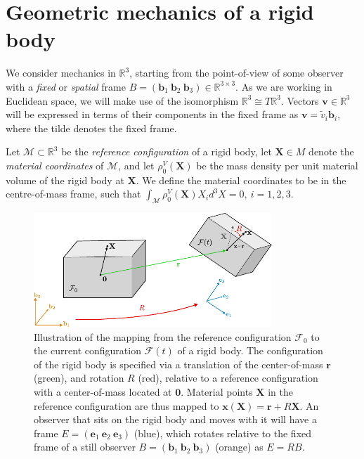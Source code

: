 \section{Geometric mechanics of a rigid body} \label{sec:Introduction - rigid body}

We consider mechanics in $\mathbb{R}^3$, starting from the point-of-view of some observer with a \textit{fixed} or \textit{spatial} frame $B = (\mathbf{b}_1\ \mathbf{b}_2\ \mathbf{b}_3) \in \mathbb{R}^{3 \times 3}$. As we are working in Euclidean space, we will make use of the isomorphism $\mathbb{R}^3 \cong T\mathbb{R}^3$. Vectors $\mathbf{v} \in \mathbb{R}^3$ will be expressed in terms of their components in the fixed frame as $\mathbf{v} = \tilde{v}_i \mathbf{b}_i$, where the tilde denotes the fixed frame.

Let $\mathcal{M} \subset \mathbb{R}^3$ be the \textit{reference configuration} of a rigid body, let $\mathbf{X} \in M$ denote the \textit{material coordinates} of $\mathcal{M}$, and let $\rho^V_0(\mathbf{X})$ be the mass density per unit material volume of the rigid body at $\mathbf{X}$. We define the material coordinates to be in the centre-of-mass frame, such that $\int_\mathcal{M} \rho^V_0(\mathbf{X}) X_i d^3 X = 0,\ i=1,2,3$.
 
\begin{figure}[t]
\centering
        \includegraphics[width=0.8\textwidth]{figs_part2/sec3.1_introduction/rigid_body_kinematics.pdf}
        \caption{Illustration of the mapping from the reference configuration $\mathcal{F}_0$ to the current configuration $\mathcal{F}(t)$ of a rigid body. The configuration of the rigid body is specified via a translation of the center-of-mass $\mathbf{r}$ (green), and rotation $R$ (red), relative to a reference configuration with a center-of-mass located at $\mathbf{0}$. Material points $\mathbf{X}$ in the reference configuration are thus mapped to $\mathbf{x}(\mathbf{X}) = \mathbf{r} + R \mathbf{X}$. An observer that sits on the rigid body and moves with it will have a frame $E = (\mathbf{e}_1\ \mathbf{e}_2\ \mathbf{e}_3)$ (blue), which rotates relative to the fixed frame of a still observer $B = (\mathbf{b}_1\ \mathbf{b}_2\ \mathbf{b}_3)$ (orange) as $E = RB$.}
        \label{fig:rigid body kinematics}
\end{figure}

